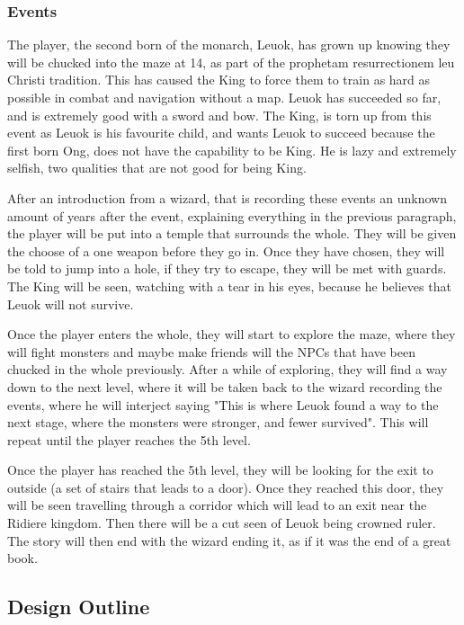 \documentclass{article}
\begin{document}
            \subsubsection{Events}
                The player, the second born of the monarch, Leuok, has grown up knowing they will be chucked into the maze at 14, as part of the prophetam resurrectionem leu Christi tradition. This has caused the King to force them to train as hard as possible in combat and navigation without a map. Leuok has succeeded so far, and is extremely good with a sword and bow. The King, is torn up from this event as Leuok is his favourite child, and wants Leuok to succeed because the first born Ong, does not have the capability to be King. He is lazy and extremely selfish, two qualities that are not good for being King.

                After an introduction from a wizard, that is recording these events an unknown amount of years after the event, explaining everything in the previous paragraph, the player will be put into a temple that surrounds the whole. They will be given the choose of a one weapon before they go in. Once they have chosen, they will be told to jump into a hole, if they try to escape, they will be met with guards. The King will be seen, watching with a tear in his eyes, because he believes that Leuok will not survive.

                Once the player enters the whole, they will start to explore the maze, where they will fight monsters and maybe make friends will the NPCs that have been chucked in the whole previously. After a while of exploring, they will find a way down to the next level, where it will be taken back to the wizard recording the events, where he will interject saying "This is where Leuok found a way to the next stage, where the monsters were stronger, and fewer survived". This will repeat until the player reaches the 5th level.

                Once the player has reached the 5th level, they will be looking for the exit to outside (a set of stairs that leads to a door). Once they reached this door, they will be seen travelling through a corridor which will lead to an exit near the Ridiere kingdom. Then there will be a cut seen of Leuok being crowned ruler. The story will then end with the wizard ending it, as if it was the end of a great book.
        \subsection{Design Outline}
\end{document}
